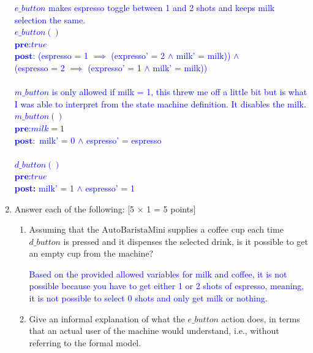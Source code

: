 \documentclass[12pt,fleqn]{article}
\begin{document}
\begin{enumerate}
\textcolor{blue}{
  $e\_button$ makes espresso toggle between 1 and 2 shots and keeps milk selection the same. \\
  $e\_button()$ \\
  $\textbf{pre:} true$  \\
  $\textbf{post:}$ (espresso = 1 $\implies$ (expresso' = 2 $\land$ milk' = milk)) $\land$ \\
                   (espresso = 2 $\implies$ (expresso' = 1 $\land$ milk' = milk)) \\
  \\
  $m\_button$ is only allowed if milk = 1, this threw me off a little bit but is what I was able to interpret from the state machine definition. It disables the milk.\\
  $m\_button()$ \\
  $\textbf{pre:} milk = 1$  \\
  $\textbf{post}:$ milk' = 0 $\land$ espresso' = espresso \\
  \\
  $d\_button()$ \\
  $\textbf{pre:} true$  \\
  \textbf{post:} milk' = 1 $\land$ espresso' = 1 \\}


\clearpage

\item Answer each of the following: [5 $\times$ 1 = 5 points]
\begin{enumerate}
\item Assuming that the $\mathrm{AutoBaristaMini}$ supplies a coffee cup each time $d\_button$ is pressed and it dispenses the selected drink, is it possible to get an empty cup from the machine?

\textcolor{blue}{Based on the provided allowed variables for milk and coffee, it is not possible because you have to get either 1 or 2 shots of espresso, meaning, it is not possible to select 0 shots and only get milk or nothing. }  


\item Give an informal explanation of what the $e\_button$ action does, in terms that an actual user of the machine would understand, i.e., without referring to the formal model.


\end{enumerate}
\end{enumerate}
\end{document}
